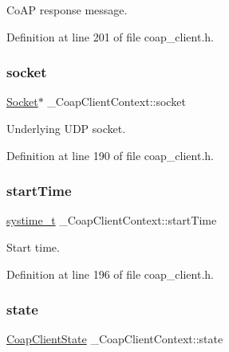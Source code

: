 Co\+AP response message. 



Definition at line 201 of file coap\+\_\+client.\+h.

\mbox{\label{struct__CoapClientContext_a797ffe0cbf7df325a9cdf4edb3720dfa}} 
\subsubsection{\texorpdfstring{socket}{socket}}
{\footnotesize\ttfamily \hyperlink{socket_8h_aa85acfb0fa336ef495e6ba87fb88fc48}{Socket}$\ast$ \+\_\+\+Coap\+Client\+Context\+::socket}



Underlying U\+DP socket. 



Definition at line 190 of file coap\+\_\+client.\+h.

\mbox{\label{struct__CoapClientContext_ae78007b71b5a47a49a5806c12e403c98}} 
\subsubsection{\texorpdfstring{start\+Time}{startTime}}
{\footnotesize\ttfamily \hyperlink{compiler__port_8h_ae3e32a98d431a02106616da3071832dd}{systime\+\_\+t} \+\_\+\+Coap\+Client\+Context\+::start\+Time}



Start time. 



Definition at line 196 of file coap\+\_\+client.\+h.

\mbox{\label{struct__CoapClientContext_a18f8dc14411d087894b08291c864c1c5}} 
\subsubsection{\texorpdfstring{state}{state}}
{\footnotesize\ttfamily \hyperlink{coap__client_8h_a0449d3c44dfab2ba1d564f8d7d50bf7d}{Coap\+Client\+State} \+\_\+\+Coap\+Client\+Context\+::state}



